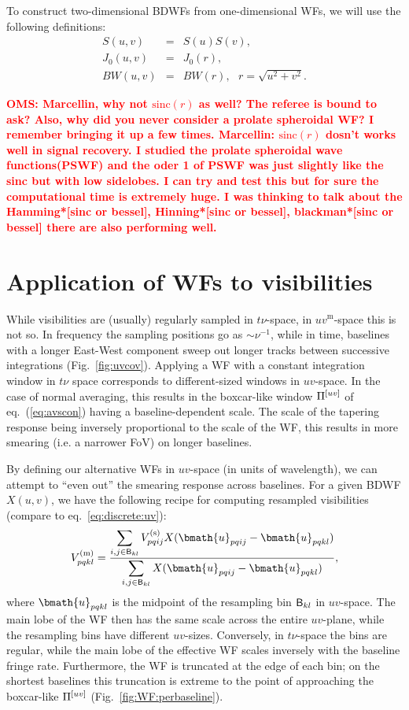 \documentclass[useAMS,usenatbib]{mn2e}
\newcommand{\OMS}[1]{\textcolor{red}{{\bf OMS: #1}}}
\begin{document}
To construct two-dimensional BDWFs from one-dimensional WFs, we will use the following definitions:
\begin{eqnarray}
S(u,v) &=& S(u)S(v), \nonumber\\
J_0(u,v) &=& J_0(r), \nonumber\\
BW(u,v) &=& BW(r),~~~r=\sqrt{u^2+v^2}.
\end{eqnarray}

\OMS{Marcellin, why not $\mathrm{sinc}(r)$ as well? The referee is bound to ask? Also, why did you never consider a 
prolate spheroidal WF? I remember bringing it up a few times. Marcellin: $\mathrm{sinc}(r)$ dosn't works well in signal recovery. I studied the prolate spheroidal wave functions(PSWF)
and the oder 1 of PSWF was just slightly like the sinc but with low sidelobes. I can try and test this but for sure 
the computational time is extremely huge. I was thinking to talk about 
the Hamming*[sinc or bessel], Hinning*[sinc or bessel], blackman*[sinc or bessel] there are also performing well.}

\section{Application of WFs to visibilities}

While visibilities are (usually) regularly sampled in $t\nu$-space, in $uv^\mathrm{m}$-space this is not so. In frequency the sampling
positions go as $\sim\nu^{-1}$, while in time, baselines with a longer East-West component sweep out longer tracks between successive 
integrations (Fig.~\ref{fig:uvcov}). Applying a WF with a constant integration window in $t\nu$ space corresponds to 
different-sized windows in $uv$-space. In the case of normal averaging, this results in the boxcar-like window $\Pi^{[uv]}$ of 
eq.~(\ref{eq:avscon}) having a baseline-dependent scale. The scale of the tapering response being inversely proportional to 
the scale of the WF, this results in more smearing (i.e. a narrower FoV) on longer baselines.

By defining our alternative WFs in $uv$-space (in units of wavelength), we can attempt to ``even out'' the smearing 
response across baselines. For a given BDWF $X(u,v)$, we have the following recipe 
for computing resampled visibilities (compare to eq.~\ref{eq:discrete:uv}):
\begin{equation}
\label{eq:avg:wf}
V^\mathrm{(m)}_{pqkl} = \frac{\displaystyle\sum\limits_{{i,j}\in \Bij_{kl}} \Vs_{pqij} X(\bmath{u}_{pqij}-\bmath{u}_{pqkl})}
{\displaystyle\sum\limits_{{i,j}\in \Bij_{kl}} X(\bmath{u}_{pqij}-\bmath{u}_{pqkl})},
\end{equation}
where $\bmath{u}_{pqkl}$ is the midpoint of the resampling bin $\mathsf{B}_{kl}$ in $uv$-space. The main lobe of the WF then 
has the same scale across the entire $uv$-plane, while the resampling bins have different $uv$-sizes. Conversely, in 
$t\nu$-space the bins
are regular, while the main lobe of the effective WF scales inversely with the baseline fringe rate. Furthermore, 
the WF is truncated at the edge of each bin; on the shortest baselines this truncation is extreme to the 
point of approaching the boxcar-like $\Pi^{[uv]}$ (Fig.~\ref{fig:WF:perbaseline}).
\end{document}
